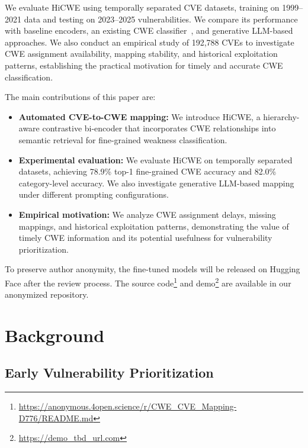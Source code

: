 \documentclass[conference,compsoc]{IEEEtran}
\begin{document}
We evaluate HiCWE using temporally separated
CVE datasets, training on 1999--2021 data
and testing on 2023--2025 vulnerabilities.
We compare its performance with baseline
encoders, an existing CWE classifier~\cite{mullikencwepredictor}, and
generative LLM-based approaches. We also
conduct an empirical study of 192,788 CVEs
to investigate CWE assignment availability,
mapping stability, and historical exploitation
patterns, establishing the practical motivation
for timely and accurate CWE classification.

The main contributions of this paper are:

\begin{itemize}
    \item \textbf{Automated CVE-to-CWE mapping:}
    We introduce HiCWE, a hierarchy-aware
    contrastive bi-encoder that incorporates
    CWE relationships into semantic retrieval
    for fine-grained weakness classification.

    \item \textbf{Experimental evaluation:}
    We evaluate HiCWE on temporally separated
    datasets, achieving 78.9\% top-1 fine-grained
    CWE accuracy and 82.0\% category-level
    accuracy. We also investigate generative
    LLM-based mapping under different prompting
    configurations.

    \item \textbf{Empirical motivation:}
    We analyze CWE assignment delays, missing
    mappings, and historical exploitation patterns,
    demonstrating the value of timely CWE
    information and its potential usefulness
    for vulnerability prioritization.
\end{itemize}

To preserve author anonymity, the fine-tuned models will be released on Hugging Face after the review process. The source code\footnote{\url{https://anonymous.4open.science/r/CWE_CVE_Mapping-D776/README.md}} and demo\footnote{\url{https://demo_tbd_url.com}} are available in our anonymized repository.


\section{Background}
\label{sec:background}

\subsection{Early Vulnerability Prioritization}
\end{document}

